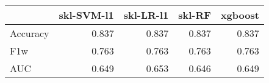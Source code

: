 \begin{tabular}{lrrrr}
\toprule
{} &  skl-SVM-l1 &  skl-LR-l1 &  skl-RF &  xgboost \\
\midrule
Accuracy &       0.837 &      0.837 &   0.837 &    0.837 \\
F1w      &       0.763 &      0.763 &   0.763 &    0.763 \\
AUC      &       0.649 &      0.653 &   0.646 &    0.649 \\
\bottomrule
\end{tabular}
